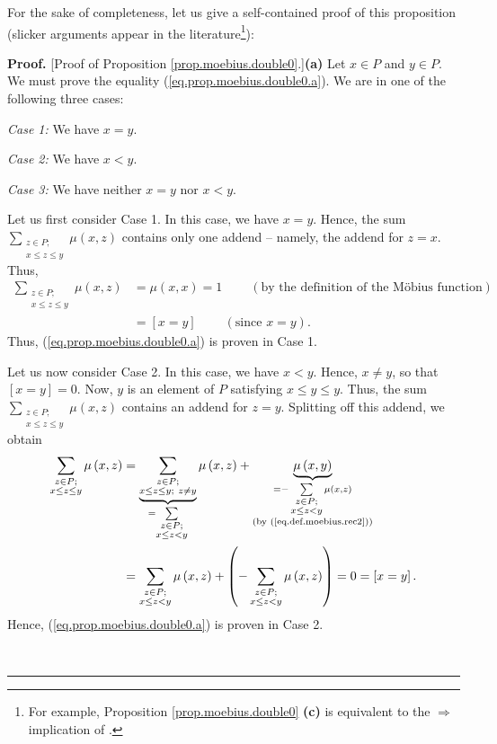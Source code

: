 \documentclass[numbers=enddot,12pt,final,onecolumn,notitlepage]{scrartcl}%
\theoremstyle{definition}
\newenvironment{proof}[1][Proof]{\noindent\textbf{#1.} }{\ \rule{0.5em}{0.5em}}
\newenvironment{vershort}{}{}
\let\sumnonlimits\sum
\renewcommand{\sum}{\sumnonlimits\limits}
\begin{document}
For the sake of completeness, let us give a self-contained proof of this
proposition (slicker arguments appear in the literature\footnote{For example,
Proposition \ref{prop.moebius.double0} \textbf{(c)} is equivalent to the
$\Longrightarrow$ implication of \cite[(2.3a)]{Martin22}.}):

\begin{vershort}
\begin{proof}
[Proof of Proposition \ref{prop.moebius.double0}.]\textbf{(a)} Let $x\in P$
and $y\in P$. We must prove the equality (\ref{eq.prop.moebius.double0.a}). We
are in one of the following three cases:

\textit{Case 1:} We have $x=y$.

\textit{Case 2:} We have $x<y$.

\textit{Case 3:} We have neither $x=y$ nor $x<y$.

Let us first consider Case 1. In this case, we have $x=y$. Hence, the sum
$\sum_{\substack{z\in P;\\x\leq z\leq y}}\mu\left(  x,z\right)  $ contains
only one addend -- namely, the addend for $z=x$. Thus,%
\begin{align*}
\sum_{\substack{z\in P;\\x\leq z\leq y}}\mu\left(  x,z\right)   &  =\mu\left(
x,x\right)  =1\ \ \ \ \ \ \ \ \ \ \left(  \text{by the definition of the
M\"{o}bius function}\right) \\
&  =\left[  x=y\right]  \ \ \ \ \ \ \ \ \ \ \left(  \text{since }x=y\right)  .
\end{align*}
Thus, (\ref{eq.prop.moebius.double0.a}) is proven in Case 1.

Let us now consider Case 2. In this case, we have $x<y$. Hence, $x\neq y$, so
that $\left[  x=y\right]  =0$. Now, $y$ is an element of $P$ satisfying $x\leq
y\leq y$. Thus, the sum $\sum_{\substack{z\in P;\\x\leq z\leq y}}\mu\left(
x,z\right)  $ contains an addend for $z=y$. Splitting off this addend, we
obtain%
\begin{align*}
\sum_{\substack{z\in P;\\x\leq z\leq y}}\mu\left(  x,z\right)   &
=\underbrace{\sum_{\substack{z\in P;\\x\leq z\leq y;\ z\neq y}}}%
_{=\sum_{\substack{z\in P;\\x\leq z<y}}}\mu\left(  x,z\right)
+\underbrace{\mu\left(  x,y\right)  }_{\substack{=-\sum_{\substack{z\in
P;\\x\leq z<y}}\mu\left(  x,z\right)  \\\text{(by (\ref{eq.def.moebius.rec2}%
))}}}\\
&  =\sum_{\substack{z\in P;\\x\leq z<y}}\mu\left(  x,z\right)  +\left(
-\sum_{\substack{z\in P;\\x\leq z<y}}\mu\left(  x,z\right)  \right)
=0=\left[  x=y\right]  .
\end{align*}
Hence, (\ref{eq.prop.moebius.double0.a}) is proven in Case 2.


\end{proof}
\end{vershort}
\end{document}
